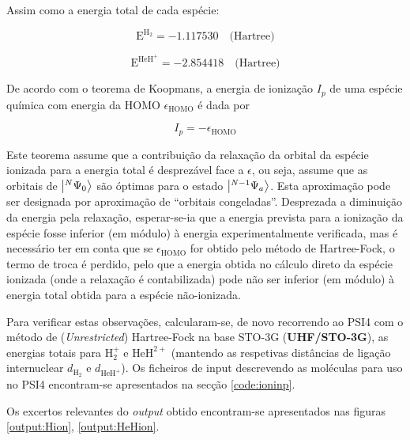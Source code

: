\documentclass[portuguese,]{article}
\begin{document}
Assim como a energia total de cada espécie:

\[ \text{E}^{\text{H}_2} = -1.117530 \quad \text{(Hartree)} \]

\[ \text{E}^{\text{HeH}^+} = -2.854418 \quad \text{(Hartree)} \]

De acordo com o teorema de Koopmans, a energia de ionização \(I_p\) de
uma espécie química com energia da HOMO \(\epsilon_\text{HOMO}\) é dada
por

\[ I_p = - \epsilon_\text{HOMO} \]

Este teorema assume que a contribuição da relaxação da orbital da
espécie ionizada para a energia total é desprezável face a \(\epsilon\),
ou seja, assume que as orbitais de \(\ket{{}^N \Psi_0}\) são óptimas
para o estado \(\ket{{}^{N-1} \Psi_a}\). Esta aproximação pode ser
designada por aproximação de ``orbitais congeladas''. Desprezada a
diminuição da energia pela relaxação, esperar-se-ia que a energia
prevista para a ionização da espécie fosse inferior (em módulo) à
energia experimentalmente verificada, mas é necessário ter em conta que
se \(\epsilon_\text{HOMO}\) for obtido pelo método de Hartree-Fock, o
termo de troca é perdido, pelo que a energia obtida no cálculo direto da
espécie ionizada (onde a relaxação é contabilizada) pode não ser
inferior (em módulo) à energia total obtida para a espécie não-ionizada.

Para verificar estas observações, calcularam-se, de novo recorrendo ao
PSI4 com o método de (\emph{Unrestricted}) Hartree-Fock na base STO-3G
(\textbf{UHF/STO-3G}), as energias totais para \(\text{H}_2^+\) e
\(\text{HeH}^{2+}\) (mantendo as respetivas distâncias de ligação
internuclear \(d_{\text{H}_2}\) e \(d_{\text{HeH}^+}\)). Os ficheiros de
input descrevendo as moléculas para uso no PSI4 encontram-se
apresentados na secção \ref{code:ioninp}.

Os excertos relevantes do \emph{output} obtido encontram-se apresentados
nas figuras \ref{output:Hion}, \ref{output:HeHion}.
\end{document}
